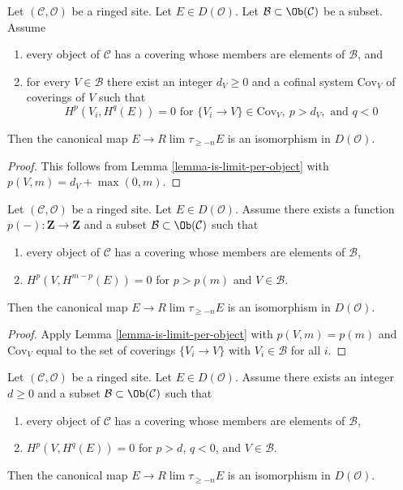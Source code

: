 \begin{lemma}
\label{lemma-is-limit-spaltenstein}
Let $(\mathcal{C}, \mathcal{O})$ be a ringed site. Let $E \in D(\mathcal{O})$.
Let $\mathcal{B} \subset \Ob(\mathcal{C})$ be a subset. Assume
\begin{enumerate}
\item every object of $\mathcal{C}$ has a covering whose members are
elements of $\mathcal{B}$, and
\item for every $V \in \mathcal{B}$ there exist an integer $d_V \geq 0$ and
a cofinal system $\text{Cov}_V$ of coverings of $V$ such that
$$
H^p(V_i, H^q(E)) = 0 \text{ for }
\{V_i \to V\} \in \text{Cov}_V,\ p > d_V, \text{ and }q < 0
$$
\end{enumerate}
Then the canonical map $E \to R\lim \tau_{\geq -n} E$
is an isomorphism in $D(\mathcal{O})$.
\end{lemma}

\begin{proof}
This follows from Lemma \ref{lemma-is-limit-per-object}
with $p(V, m) = d_V + \max(0, m)$.
\end{proof}

\begin{lemma}
\label{lemma-is-limit}
Let $(\mathcal{C}, \mathcal{O})$ be a ringed site. Let $E \in D(\mathcal{O})$.
Assume there exists a function $p(-) : \mathbf{Z} \to \mathbf{Z}$
and a subset $\mathcal{B} \subset \Ob(\mathcal{C})$ such that
\begin{enumerate}
\item every object of $\mathcal{C}$ has a covering whose members are
elements of $\mathcal{B}$,
\item $H^p(V, H^{m - p}(E)) = 0$ for $p > p(m)$ and $V \in \mathcal{B}$.
\end{enumerate}
Then the canonical map $E \to R\lim \tau_{\geq -n} E$
is an isomorphism in $D(\mathcal{O})$.
\end{lemma}

\begin{proof}
Apply Lemma \ref{lemma-is-limit-per-object}
with $p(V, m) = p(m)$ and $\text{Cov}_V$
equal to the set of coverings $\{V_i \to V\}$ with
$V_i \in \mathcal{B}$ for all $i$.
\end{proof}

\begin{lemma}
\label{lemma-is-limit-dimension}
Let $(\mathcal{C}, \mathcal{O})$ be a ringed site. Let $E \in D(\mathcal{O})$.
Assume there exists an integer $d \geq 0$
and a subset $\mathcal{B} \subset \Ob(\mathcal{C})$ such that
\begin{enumerate}
\item every object of $\mathcal{C}$ has a covering whose members are
elements of $\mathcal{B}$,
\item $H^p(V, H^q(E)) = 0$ for $p > d$, $q < 0$, and $V \in \mathcal{B}$.
\end{enumerate}
Then the canonical map $E \to R\lim \tau_{\geq -n} E$
is an isomorphism in $D(\mathcal{O})$.
\end{lemma}

